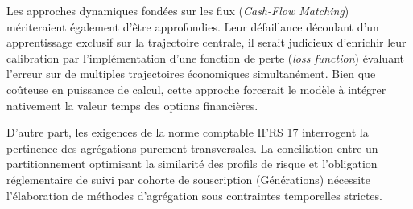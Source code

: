 Les approches dynamiques fondées sur les flux (\textit{Cash-Flow Matching}) mériteraient également d'être approfondies. Leur défaillance découlant d'un apprentissage exclusif sur la trajectoire centrale, il serait judicieux d'enrichir leur calibration par l'implémentation d'une fonction de perte (\textit{loss function}) évaluant l'erreur sur de multiples trajectoires économiques simultanément. Bien que coûteuse en puissance de calcul, cette approche forcerait le modèle à intégrer nativement la valeur temps des options financières.

D'autre part, les exigences de la norme comptable IFRS 17 interrogent la pertinence des agrégations purement transversales. La conciliation entre un partitionnement optimisant la similarité des profils de risque et l'obligation réglementaire de suivi par cohorte de souscription (Générations) nécessite l'élaboration de méthodes d'agrégation sous contraintes temporelles strictes.

